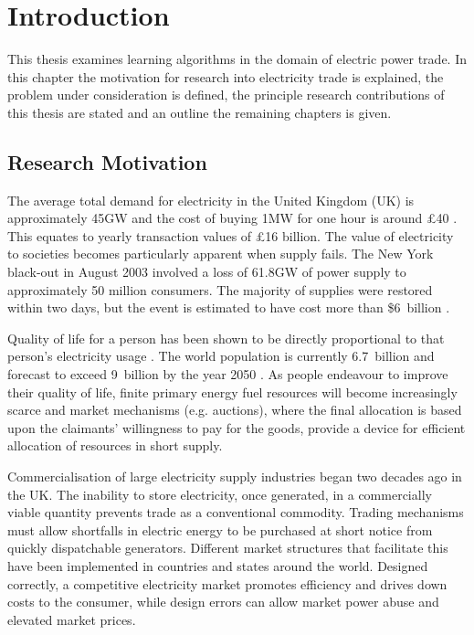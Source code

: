 \chapter{Introduction}
This thesis examines learning algorithms in the domain of electric power
trade.  In this chapter the motivation for research into
electricity trade is explained, the problem under consideration is defined,
the principle research contributions of this thesis are stated and an
outline the remaining chapters is given.

\section{Research Motivation}
The average total demand for electricity in the United Kingdom (UK) is
approximately 45GW and the cost of buying 1MW for one hour is around
\pounds40 \cite{decc:dukes09}. This equates to yearly transaction values of
\pounds16 billion.  The value of electricity to societies becomes particularly
apparent when supply fails. The New York black-out in August 2003 involved
a loss of 61.8GW of power supply to approximately 50 million consumers.
The majority of supplies were restored within two days, but the event is
estimated to have cost more than \$6~billion \cite{minkel:2008,icf:2003}.

Quality of life for a person has been shown to be directly proportional to that
person's electricity usage \cite{alam:qol}.  The world
population is currently 6.7~billion and forecast to exceed 9~billion by the
year 2050 \cite{un:pop}.
As people endeavour to improve their quality of life,
finite primary energy fuel resources will become increasingly scarce and
market mechanisms (e.g. auctions), where the final allocation is based upon the
claimants' willingness to pay for the goods, provide a device for efficient
allocation of resources in short supply.

Commercialisation of large electricity supply industries began two
decades ago in the UK. The inability to store electricity, once generated, in a
commercially viable quantity prevents trade as a conventional commodity.
Trading mechanisms must allow shortfalls in electric energy to be purchased at
short notice from quickly dispatchable generators.  Different market structures
that facilitate this have been implemented in countries and states around the
world.  Designed correctly, a competitive electricity market promotes
efficiency and drives down costs to the consumer, while design errors can
allow market power abuse and elevated market prices.

